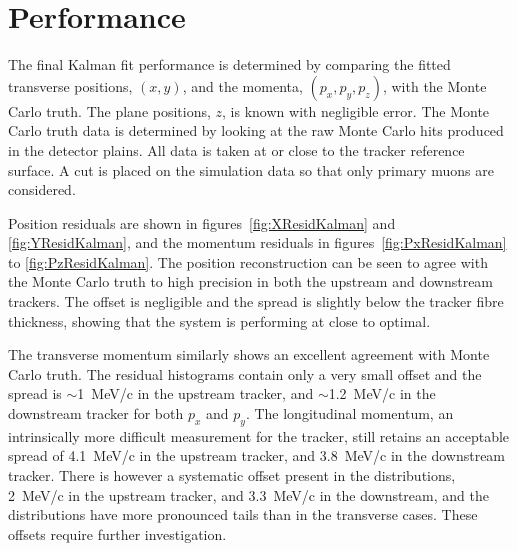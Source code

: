 \section{Performance}
\label{sec:Performance}

  The final Kalman fit performance is determined by comparing the fitted transverse positions, $(x,y)$, and the momenta, $(p_x, p_y, p_z)$, with the Monte Carlo truth. The plane positions, $z$, is known with negligible error. The Monte Carlo truth data is determined by looking at the raw Monte Carlo hits produced in the detector plains.  All data is taken at or close to the tracker reference surface. A cut is placed on the simulation data so that only primary muons are considered. 
  
  Position residuals are shown in figures~\ref{fig:XResidKalman} and \ref{fig:YResidKalman}, and the momentum residuals in figures~\ref{fig:PxResidKalman} to \ref{fig:PzResidKalman}.  The position reconstruction can be seen to agree with the Monte Carlo truth to high precision in both the upstream and downstream trackers. The offset is negligible and the spread is slightly below the tracker fibre thickness, showing that the system is performing at close to optimal.
  
  The transverse momentum similarly shows an excellent agreement with Monte Carlo truth. The residual histograms contain only a very small offset and the spread is $\sim$1~MeV/c in the upstream tracker, and $\sim$1.2~MeV/c in the downstream tracker for both $p_x$ and $p_y$.  The longitudinal momentum, an intrinsically more difficult measurement for the tracker, still retains an acceptable spread of 4.1~MeV/c in the upstream tracker, and 3.8~MeV/c in the downstream tracker.  There is however a systematic offset present in the distributions, 2~MeV/c in the upstream tracker, and 3.3~MeV/c in the downstream, and the distributions have more pronounced tails than in the transverse cases.  These offsets require further investigation.  

